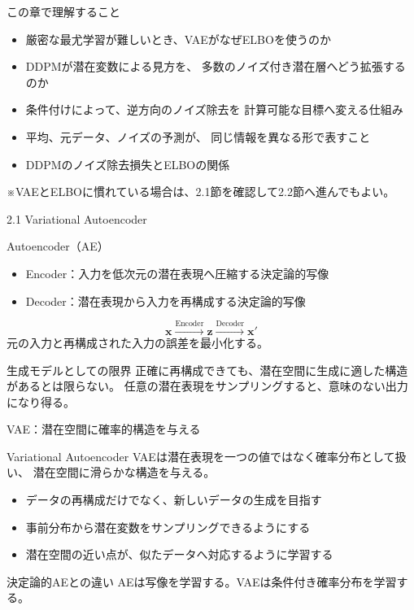 \begin{frame}{この章で理解すること}
    \begin{itemize}
        \item 厳密な最尤学習が難しいとき、VAEがなぜELBOを使うのか
        \item DDPMが潜在変数による見方を、
        多数のノイズ付き潜在層へどう拡張するのか
        \item 条件付けによって、逆方向のノイズ除去を
        計算可能な目標へ変える仕組み
        \item 平均、元データ、ノイズの予測が、
        同じ情報を異なる形で表すこと
        \item DDPMのノイズ除去損失とELBOの関係
    \end{itemize}
    \vspace{0.5em}
    \small
    ※VAEとELBOに慣れている場合は、2.1節を確認して2.2節へ進んでもよい。
\end{frame}
\begin{frame}{2.1 Variational Autoencoder}
    \begin{block}{Autoencoder（AE）}
        \begin{itemize}
            \item Encoder：入力を低次元の潜在表現へ圧縮する決定論的写像
            \item Decoder：潜在表現から入力を再構成する決定論的写像
        \end{itemize}
        \[
            \boldsymbol{x}
            \xrightarrow{\text{Encoder}}
            \boldsymbol{z}
            \xrightarrow{\text{Decoder}}
            \boldsymbol{x}'
        \]
        元の入力と再構成された入力の誤差を最小化する。
    \end{block}
    \begin{alertblock}{生成モデルとしての限界}
        正確に再構成できても、潜在空間に生成に適した構造があるとは限らない。
        任意の潜在表現をサンプリングすると、意味のない出力になり得る。
    \end{alertblock}
\end{frame}
\begin{frame}{VAE：潜在空間に確率的構造を与える}
    \begin{block}{Variational Autoencoder}
        VAEは潜在表現を一つの値ではなく確率分布として扱い、
        潜在空間に滑らかな構造を与える。
    \end{block}
    \vspace{0.5em}
    \begin{itemize}
        \item データの再構成だけでなく、新しいデータの生成を目指す
        \item 事前分布から潜在変数をサンプリングできるようにする
        \item 潜在空間の近い点が、似たデータへ対応するように学習する
    \end{itemize}
    \begin{exampleblock}{決定論的AEとの違い}
        AEは写像を学習する。VAEは条件付き確率分布を学習する。
    \end{exampleblock}
\end{frame}
